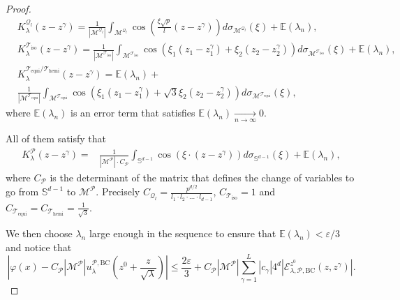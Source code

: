 \documentclass{amsart}
\theoremstyle{definition}
\theoremstyle{remark}
\newcommand{\ep}{\varepsilon}
\newcommand{\vp}{\varphi}
\renewcommand\leq\leqslant
\numberwithin{equation}{section}
\theoremstyle{definition}
\theoremstyle{remark}
\begin{document}
\begin{proof}
	\begin{equation}
		\begin{aligned}
			&K_{\lambda}^{\mathcal{Q}_l}(z-z^\gamma)=\frac{1}{|\mathcal{M}^{\mathcal{Q}_l}|}\int_{\mathcal{M}^{\mathcal{Q}_l}}\cos\left(\frac{\xi \sqrt{p}}{l}(z-z^\gamma)\right)d\sigma_{\mathcal{M}^{\mathcal{Q}_l}}(\xi)+\mathbb{E}(\lambda_n),\\
			&K_{\lambda}^{\mathcal{T}_\mathrm{iso}}(z-z^\gamma)=\frac{1}{|\mathcal{M}^{\mathcal{T}_\mathrm{iso}}|}\int_{\mathcal{M}^{\mathcal{T}_\mathrm{iso}}}\cos\left(\xi_1(z_1-z_1^\gamma)+\xi_2(z_2-z_2^\gamma)\right)d\sigma_{\mathcal{M}^{\mathcal{T}_\mathrm{iso}}}(\xi)+\mathbb{E}(\lambda_n),\\ &K_{\lambda}^{\mathcal{T}_\mathrm{equi}/\mathcal{T}_\mathrm{hemi}}(z-z^\gamma)=\mathbb{E}(\lambda_n)+\\&\frac{1}{|\mathcal{M}^{\mathcal{T}_\mathrm{equi}}|}\int_{\mathcal{M}^{\mathcal{T}_\mathrm{equi}}}\cos\left(\xi_1(z_1-z_1^\gamma)+\sqrt{3}\xi_2(z_2-z_2^\gamma)\right)d\sigma_{\mathcal{M}^{\mathcal{T}_\mathrm{equi}}}(\xi),
		\end{aligned}
	\end{equation}where $\mathbb{E}(\lambda_n)$ is an error term that satisfies $\mathbb{E}(\lambda_n)\xrightarrow[n\rightarrow \infty ]{}0$.
	
	All of them satisfy that 
	\begin{equation}
		\begin{aligned}
			K_{\lambda}^\mathcal{P}(z-z^\gamma)=&\frac{1}{|\mathcal{M}^\mathcal{P}|\cdot C_\mathcal{P}}\int_{\mathbb{S}^{d-1}}\cos\left(\xi\cdot(z-z^\gamma)\right)d\sigma_{\mathbb{S}^{d-1}}(\xi)+\mathbb{E}(\lambda_n),
		\end{aligned}
	\end{equation}where $C_\mathcal{P}$ is the determinant of the matrix that defines the change of variables to go from $\mathbb{S}^{d-1}$ to $\mathcal{M}^\mathcal{P}$. Precisely $C_{\mathcal{Q}_l}=\frac{p^{d/2}}{l_1\cdot l_2\cdot \ldots\cdot l_{d-1}}$, $C_{\mathcal{T}_\mathrm{iso}}=1$ and $C_{\mathcal{T}_\mathrm{equi}}=C_{\mathcal{T}_\mathrm{hemi}}=\frac{1}{\sqrt{3}}$.
	
	We then choose $\lambda_n$ large enough in the sequence to ensure that $\mathbb{E}(\lambda_n)<\ep/3$ and notice that\begin{equation}
		\left|	\vp(x)-	C_{\mathcal{P}}|\mathcal{M}^\mathcal{P}|	u_\lambda^{\mathcal{P},\mathrm{BC}}\left(z^0+\frac{z}{\sqrt{\lambda}}\right)\right|\leq\frac{2\ep}{3}+	C_\mathcal{P}|\mathcal{M}^\mathcal{P}|\sum_{\gamma=1}^{L}|c_\gamma|4^d\left|\mathcal{E}_{\lambda,\mathcal{P},\mathrm{BC}}^{z^0}(z,z^\gamma)\right|.
	\end{equation}
	

\end{proof}
\end{document}
